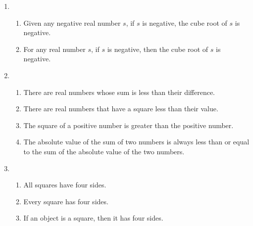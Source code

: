 \documentclass[12pt]{article}
\begin{document}
\begin{enumerate}
\item %
  \begin{enumerate}
  \item Given any negative real number $s$, if $s$ is negative, the cube root of $s$ is negative.
  \item For any real number $s$, if $s$ is negative, then the cube
    root of $s$ is negative.
  \end{enumerate}

\item %
  \begin{enumerate}
  \item There are real numbers whose sum is less than their difference.
  \item There are real numbers that have a square less than their value.
  \item The square of a positive number is greater than the positive number.
  \item The absolute value of the sum of two numbers is always less
    than or equal to the sum of the absolute value of the two numbers.
  \end{enumerate}

\item %
  \begin{enumerate}
  \item All squares have four sides.
  \item Every square has four sides.
  \item If an object is a square, then it has four sides.
  \end{enumerate}


\end{enumerate}
\end{document}
